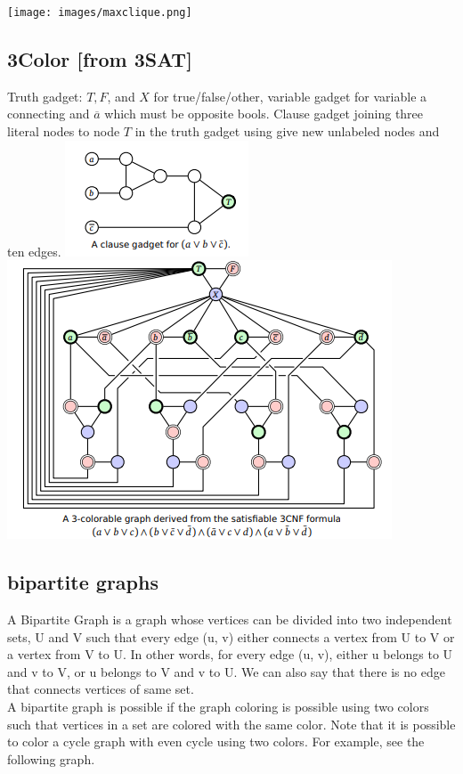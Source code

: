 \texttt{[image: images/maxclique.png]}

\subsection{3Color [from 3SAT]}
Truth gadget: $T,F$, and $X$ for true/false/other, variable gadget for variable a connecting and $\overbar{a}$ which must be opposite bools. Clause gadget joining three literal nodes to node $T$ in the truth gadget using give new unlabeled nodes and ten edges.
\includegraphics{images/3colorgadget.png}
\includegraphics[width=\linewidth]{images/3colorgraph.png}

\subsection{bipartite graphs}
A Bipartite Graph is a graph whose vertices can be divided into two independent sets, U and V such that every edge (u, v) either connects a vertex from U to V or a vertex from V to U. In other words, for every edge (u, v), either u belongs to U and v to V, or u belongs to V and v to U. We can also say that there is no edge that connects vertices of same set.\\
A bipartite graph is possible if the graph coloring is possible using two colors such that vertices in a set are colored with the same color. Note that it is possible to color a cycle graph with even cycle using two colors. For example, see the following graph.

